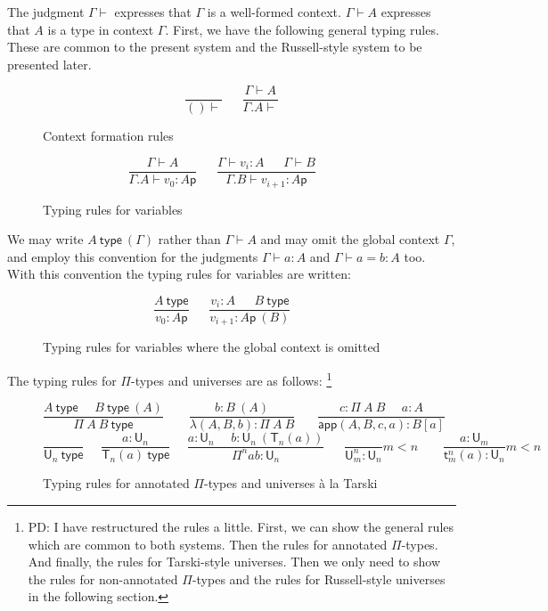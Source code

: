 \documentclass[11pt,a4paper]{article}
\theoremstyle{definition}
\def\UU{\mathsf{U}}
\newcommand{\type}{\mathsf{type}}
\newcommand{\LAM}{\lambda}
\newcommand{\APP}{\mathsf{app}}
\newcommand{\T}{\mathsf{T}}
\newcommand{\sT}{\mathsf{t}}
\newcommand{\pp}{\mathsf{p}}
\begin{document}
\medskip

The judgment $\Gamma\vdash$ expresses that $\Gamma$ is a well-formed context. $\Gamma\vdash A$ expresses that $A$ is a type in context $\Gamma$. First, we have the following general typing rules. These are common to the present system and the Russell-style system to be presented later.
\begin{figure}[H]
  \caption{Context formation rules} 
  $$
\frac{}{()\vdash}~~~~~~~\frac{\Gamma\vdash A}{\Gamma.A\vdash}
$$
\end{figure}
\begin{figure}[H]
  \caption{Typing rules for variables} 
  $$
\frac{\Gamma\vdash A}{\Gamma.A\vdash v_0:A\pp}~~~~~~~
\frac{\Gamma\vdash v_i:A~~~~~~~\Gamma\vdash B}{\Gamma.B\vdash v_{i+1}:A\pp}~~~~~~~
$$
\end{figure}
We may write $A~\type~(\Gamma)$ rather than $\Gamma\vdash A$ and may omit the global context $\Gamma$, and employ this convention for the judgments $\Gamma \vdash a : A$ and $\Gamma \vdash a = b : A$ too. With this convention the typing rules for variables are written:
\begin{figure}[h]
\caption{Typing rules for variables where the global context is omitted}
$$
\frac{A~\type}{v_0:A\pp}~~~~~~~
\frac{v_i:A~~~~~~~B~\type}{v_{i+1}:A\pp\ (B)}~~~~~~~
$$
\end{figure}

The typing rules for $\Pi$-types and universes are as follows:
\footnote{PD: I have restructured the rules a little. First, we can show the general rules which are common to both systems. Then the rules for annotated $\Pi$-types. And finally, the rules for Tarski-style universes. Then we only need to show the rules for non-annotated $\Pi$-types and the rules for Russell-style universes in the following section.}
\begin{figure}[H]
  \caption{Typing rules for annotated $\Pi$-types and universes \`a la Tarski}\label{type-Tarski}
$$
    \frac{A~\type~~~~~~B~\type~(A)}{\Pi~A~B~\type}
 ~~~~~~~~~
\frac{b:B~(A)}{\LAM(A,B,b):\Pi~A~B}
~~~~~~~~
\frac{c:\Pi~A~B~~~~~~a:A}
     {\APP(A,B,c,a):B[a]}
$$
$$
\frac{}{\UU_n~\type}~~~~~~
\frac{a:\UU_{n}}{\T_{n}(a)~\type}~~~~~~
\frac{a:\UU_{n}~~~~~~b:\UU_n~(\T_{n}(a))}
     {\Pi^{n} a b:\UU_{n}}
        ~~~~~~~
\frac{}{\UU^{n}_m:\UU_{n}}m<n
~~~~~~~~~\frac{a:\UU_{m}}{\sT_{m}^{n}(a):\UU_{n}}m<n
$$
\end{figure}
\end{document}
